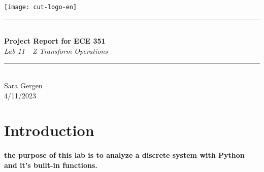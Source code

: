 \documentclass[12pt,a4paper]{article}
\newcommand{\HRule}{\rule{\linewidth}{0.5mm}}
\begin{document}
\begin{titlepage}
\begin{center}

\texttt{[image: cut-logo-en]}~\\[2cm]


\HRule \\[0.4cm]
{ \LARGE 
  \textbf{Project Report for ECE 351}\\[0.4cm]
  \emph{Lab 11 - Z Transform Operations}\\[0.4cm]
}
\HRule \\[1.5cm]



{ \large
  Sara Gergen \\[0.1cm]
  4/11/2023\\[0.1cm]
}

\vfill



\end{center}
\end{titlepage}


\newpage



\tableofcontents
{}
\newpage
\setcounter{page}{1}

\section{Introduction}\label{sec:intro}

\paragraph{the purpose of this lab is to analyze a discrete system with Python and it's built-in functions.}
\end{document}
